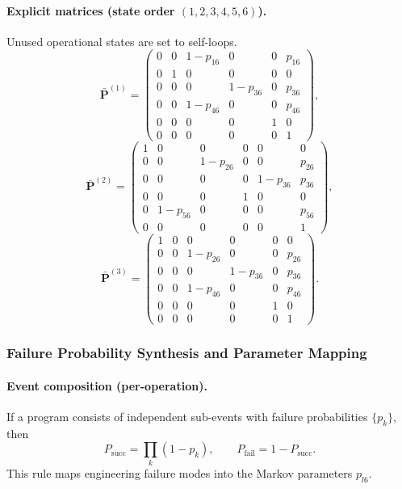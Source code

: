 ﻿\documentclass{mcmthesis}
\begin{document}
\paragraph{Explicit matrices (state order $(1,2,3,4,5,6)$).}
Unused operational states are set to self-loops.
\[
\bar{\mathbf P}^{(1)}=
\begin{pmatrix}
0 & 0 & 1-p_{16} & 0 & 0 & p_{16}\\
0 & 1 & 0        & 0 & 0 & 0\\
0 & 0 & 0        & 1-p_{36} & 0 & p_{36}\\
0 & 0 & 1-p_{46} & 0 & 0 & p_{46}\\
0 & 0 & 0        & 0 & 1 & 0\\
0 & 0 & 0        & 0 & 0 & 1
\end{pmatrix},
\]
\[
\bar{\mathbf P}^{(2)}=
\begin{pmatrix}
1 & 0 & 0        & 0 & 0 & 0\\
0 & 0 & 1-p_{26} & 0 & 0 & p_{26}\\
0 & 0 & 0        & 0 & 1-p_{36} & p_{36}\\
0 & 0 & 0        & 1 & 0 & 0\\
0 & 1-p_{56} & 0  & 0 & 0 & p_{56}\\
0 & 0 & 0        & 0 & 0 & 1
\end{pmatrix},
\]
\[
\bar{\mathbf P}^{(3)}=
\begin{pmatrix}
1 & 0 & 0        & 0 & 0 & 0\\
0 & 0 & 1-p_{26} & 0 & 0 & p_{26}\\
0 & 0 & 0        & 1-p_{36} & 0 & p_{36}\\
0 & 0 & 1-p_{46} & 0 & 0 & p_{46}\\
0 & 0 & 0        & 0 & 1 & 0\\
0 & 0 & 0        & 0 & 0 & 1
\end{pmatrix}.
\]

\subsubsection{Failure Probability Synthesis and Parameter Mapping}
\label{sec:model2_param}

\paragraph{Event composition (per-operation).}
If a program consists of independent sub-events with failure probabilities $\{p_k\}$, then
\[
P_{\text{succ}}=\prod_k (1-p_k),\qquad
P_{\text{fail}}=1-P_{\text{succ}}.
\]
This rule maps engineering failure modes into the Markov parameters $p_{l6}$.
\end{document}
